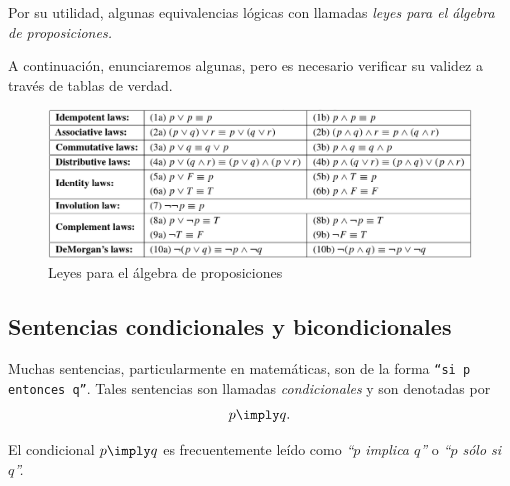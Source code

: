 

 Por su utilidad, algunas equivalencias lógicas con llamadas \emph{leyes para el álgebra de proposiciones.}
 
 
 A continuación, enunciaremos algunas, pero es necesario verificar su validez a trav\'es de tablas de verdad. 



\begin{figure}
	\centering
	\includegraphics[width=\linewidth]{md/tabla_4-1}
 \caption{Leyes para el álgebra de proposiciones}
\label{fig:tabla:4.1}
\end{figure}



\subsection{Sentencias condicionales y bicondicionales}


 Muchas sentencias, particularmente en matemáticas, son de la forma \texttt{``si $p$ entonces $q$''}.  Tales sentencias son llamadas \emph{condicionales} y son denotadas por 
 $$
 p \imply q.
 $$ 



 El condicional $p \imply q$ es frecuentemente leído como \emph{``$p$ implica $q$''} o \emph{``$p$ sólo si $q$''.}




